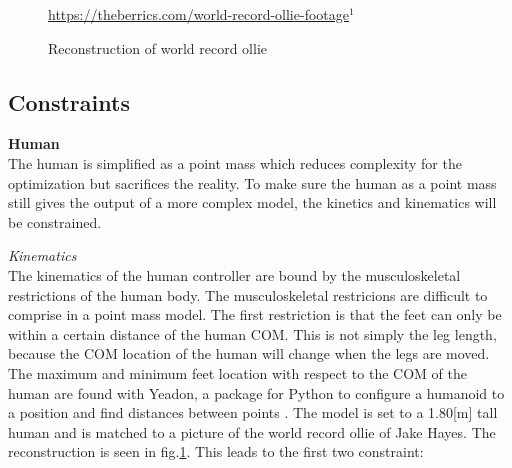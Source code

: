 \documentclass[default,iicol]{sn-jnl}
\begin{document}
\begin{figure}
    \centering
    \quad
    \caption{Reconstruction of world record ollie} 
    \label{fig:f_record}
    \centering \footnotesize \url{https://theberrics.com/world-record-ollie-footage}$^{1}$%
\end{figure}

\subsection{Constraints}
\quad \textbf{Human}\\
The human is simplified as a point mass which reduces complexity for the optimization but sacrifices the reality. To make sure the human as a point mass still gives the output of a more complex model, the kinetics and kinematics will be constrained. 

\textit{Kinematics} \\
The kinematics of the human controller are bound by the musculoskeletal restrictions of the human body. The musculoskeletal restricions are difficult to comprise in a point mass model. The first restriction is that the feet can only be within a certain distance of the human COM. This is not simply the leg length, because the COM location of the human will change when the legs are moved. The maximum and minimum feet location with respect to the COM of the human are found with Yeadon, a package for Python to configure a humanoid to a position and find distances between points \cite{yeadon_simulation_1990}. The model is set to a 1.80[m] tall human and is matched to a picture of the world record ollie of Jake Hayes. The reconstruction is seen in fig.\ref{fig:f_record}. This leads to the first two constraint:
\end{document}
